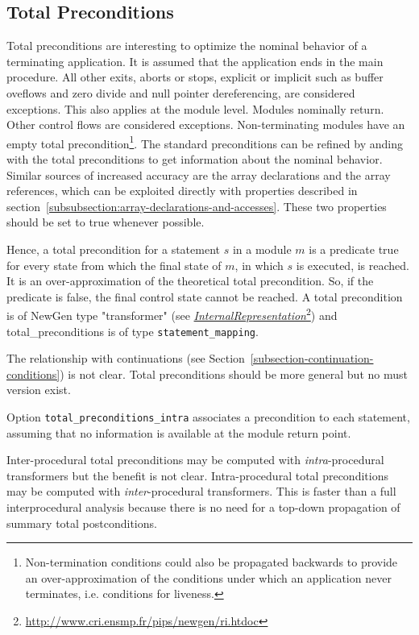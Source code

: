 \documentclass[a4paper]{report}
\newcommand{\LINK}[2]{\href{#2}{#1}\footnote{\url{#2}}\xspace}
\newcommand{\Pri}{\LINK{\emph{Internal\space{}Representation}}{http://www.cri.ensmp.fr/pips/newgen/ri.htdoc}}
\begin{document}
\subsection{Total Preconditions}
\label{subsubsection-ototal-preconditions}

Total preconditions are interesting to optimize the nominal behavior
of a terminating application. It is assumed that the application ends
in the main procedure. All other exits, aborts or stops, explicit or
implicit such as buffer oveflows and zero divide and null pointer
dereferencing, are considered exceptions. This also applies at the
module level. Modules nominally return. Other control flows are
considered exceptions. Non-terminating modules have an empty total
precondition\footnote{Non-termination conditions could also be
  propagated backwards to provide an over-approximation of the
  conditions under which an application never terminates,
  i.e. conditions for liveness.}. The standard preconditions can be
refined by anding with the total preconditions to get information
about the nominal behavior. Similar sources of increased accuracy are
the array declarations and the array references, which can be
exploited directly with properties described in
section~\ref{subsubsection:array-declarations-and-accesses}. These two
properties should be set to true whenever possible.

Hence, a total precondition for a statement $s$ in a module $m$ is a predicate true
for every state from which the final state of $m$, in which $s$
is executed, is reached. It is an over-approximation of the theoretical
total precondition. So, if the predicate is false, the final control state
cannot be reached. A total precondition is of NewGen type "transformer" (see
\Pri{}) and total\_preconditions is of type \verb+statement_mapping+.

The relationship with continuations (see
Section~\ref{subsection-continuation-conditions}) is not clear. Total
preconditions should be more general but no must version exist.

Option \verb+total_preconditions_intra+ associates a precondition to each
statement, assuming that no information is available at the module return
point.

Inter-procedural total preconditions may be computed with {\em
intra}-procedural transformers but the benefit is not
clear. Intra-procedural total preconditions may be computed with {\em
inter}-procedural transformers. This is faster than a full
interprocedural analysis because there is no need for a top-down
propagation of summary total postconditions.
\end{document}
